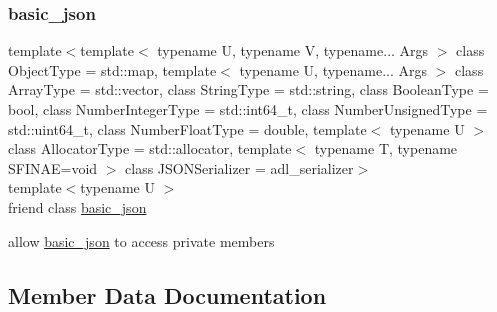 \subsubsection{\texorpdfstring{basic\+\_\+json}{basic\_json}}
{\footnotesize\ttfamily template$<$template$<$ typename U, typename V, typename... Args $>$ class Object\+Type = std\+::map, template$<$ typename U, typename... Args $>$ class Array\+Type = std\+::vector, class String\+Type  = std\+::string, class Boolean\+Type  = bool, class Number\+Integer\+Type  = std\+::int64\+\_\+t, class Number\+Unsigned\+Type  = std\+::uint64\+\_\+t, class Number\+Float\+Type  = double, template$<$ typename U $>$ class Allocator\+Type = std\+::allocator, template$<$ typename T, typename S\+F\+I\+N\+A\+E=void $>$ class J\+S\+O\+N\+Serializer = adl\+\_\+serializer$>$ \\
template$<$typename U $>$ \\
friend class \hyperlink{classnlohmann_1_1basic__json}{basic\+\_\+json}\hspace{0.3cm}{\ttfamily [friend]}}



allow \hyperlink{classnlohmann_1_1basic__json}{basic\+\_\+json} to access private members 



\subsection{Member Data Documentation}
\mbox{\label{classnlohmann_1_1basic__json_1_1iter__impl_a15e9b7b591b09fe7945a2b41bf3de0c1}} 
